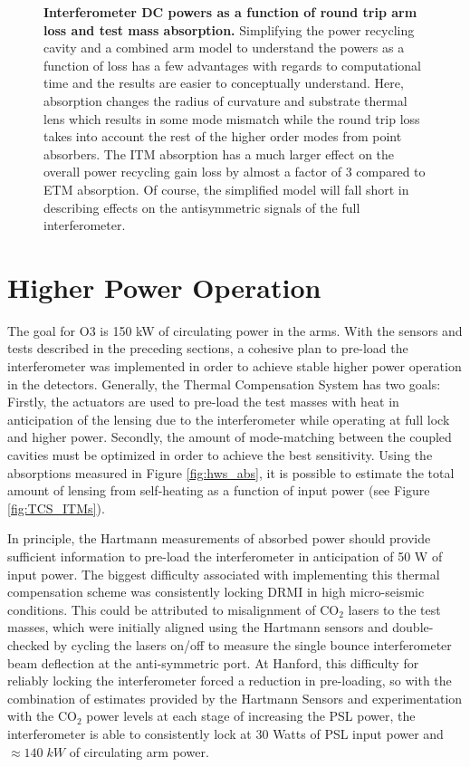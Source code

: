 \begin{figure}
\begin{minipage}{0.5\textheight}
		\end{minipage}
		\caption[Interferometer DC powers as a function of round trip arm loss and test mass absorption.]  
		{\textbf{Interferometer DC powers as a function of round trip arm loss and test mass absorption.}
			Simplifying the power recycling cavity and a combined arm model to understand the powers as a function of loss has a few advantages with regards to computational time and the results are easier to conceptually understand.  Here, absorption changes the radius of curvature and substrate thermal lens which results in some mode mismatch while the round trip loss takes into account the rest of the higher order modes from point absorbers.  The ITM absorption has a much larger effect on the overall power recycling gain loss by almost a factor of 3 compared to ETM absorption.  Of course, the simplified model will fall short in describing effects on the antisymmetric signals of the full interferometer.
		}
		\label{fig:simple_prc_arm}
	\end{figure}

\clearpage

\section{Higher Power Operation}
	The goal for O3 is 150 kW of circulating power in the arms. With the sensors and tests described in the preceding sections, a cohesive plan to pre-load the interferometer was implemented in order to achieve stable higher power operation in the detectors.  Generally, the Thermal Compensation System has two goals: Firstly, the actuators are used to pre-load the test masses with heat in anticipation of the lensing due to the interferometer while operating at full lock and higher power.  Secondly, the amount of mode-matching between the coupled cavities must be optimized in order to achieve the best sensitivity.  Using the absorptions measured in Figure \ref{fig:hws_abs}, it is possible to estimate the total amount of lensing from self-heating as a function of input power (see Figure \ref{fig:TCS_ITMs}).

	In principle, the Hartmann measurements of absorbed power should provide sufficient information to pre-load the interferometer in anticipation of 50 W of input power.  The biggest difficulty associated with implementing this thermal compensation scheme was consistently locking DRMI in high micro-seismic conditions. This could be attributed to misalignment of CO$_2$ lasers to the test masses, which were initially aligned using the Hartmann sensors and double-checked by cycling the lasers on/off to measure the single bounce interferometer beam deflection at the anti-symmetric port. At Hanford, this difficulty for reliably locking the interferometer forced a reduction in pre-loading, so with the combination of estimates provided by the Hartmann Sensors and experimentation with the CO$_2$ power levels at each stage of increasing the PSL power, the interferometer is able to consistently lock at 30 Watts of PSL input power and $\approx 140 \; kW$ of circulating arm power. 
	
